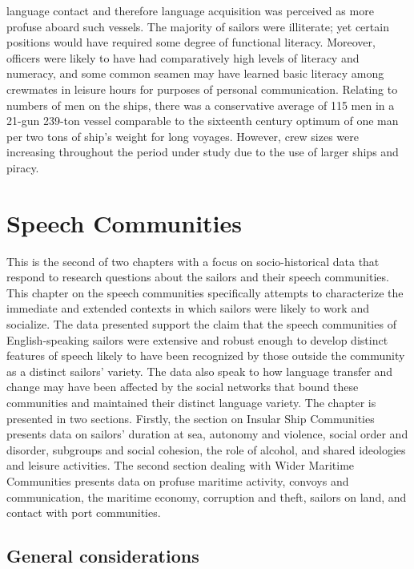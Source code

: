 language contact and therefore language acquisition was perceived as more profuse aboard such vessels. The majority of sailors were illiterate; yet certain positions would have required some degree of functional literacy. Moreover, officers were likely to have had comparatively high levels of literacy and numeracy, and some common seamen may have learned basic literacy among crewmates in leisure hours for purposes of personal communication. Relating to numbers of men on the ships, there was a conservative average of 115 men in a 21-gun 239-ton vessel comparable to the sixteenth century optimum of one man per two tons of ship’s weight for long voyages. However, crew sizes were increasing throughout the period under study due to the use of larger ships and piracy. 

  \chapter{  \textbf{Speech} \textbf{Communities}}

This is the second of two chapters with a focus on socio-historical data that respond to research questions about the sailors and their speech communities. This chapter on the speech communities specifically attempts to characterize the immediate and extended contexts in which sailors were likely to work and socialize. The data presented support the claim that the speech communities of English-speaking sailors were extensive and robust enough to develop distinct features of speech likely to have been recognized by those outside the community as a distinct sailors’ variety. The data also speak to how language transfer and change may have been affected by the social networks that bound these communities and maintained their distinct language variety. The chapter is presented in two sections. Firstly, the section on Insular Ship Communities presents data on sailors’ duration at sea, autonomy and violence, social order and disorder, subgroups and social cohesion, the role of alcohol, and shared ideologies and leisure activities. The second section dealing with Wider Maritime Communities presents data on profuse maritime activity, convoys and communication, the maritime economy, corruption and theft, sailors on land, and contact with port communities. 

\section{\textbf{General} \textbf{considerations}}%

